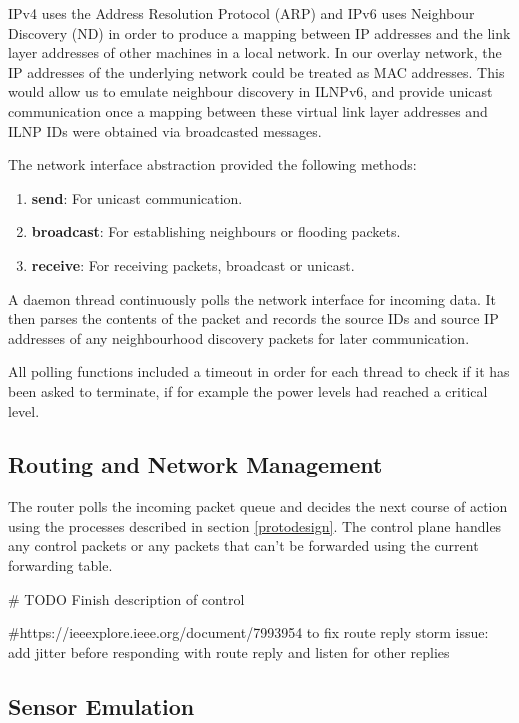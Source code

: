\documentclass[12pt]{article}
\begin{document}
IPv4 uses the Address Resolution Protocol (ARP) and IPv6 uses Neighbour Discovery (ND) in order to produce a mapping between IP addresses and the link layer addresses of other machines in a local network. In our overlay network, the IP addresses of the underlying network could be treated as MAC addresses. This would allow us to emulate neighbour discovery in ILNPv6, and provide unicast communication once a mapping between these virtual link layer addresses and ILNP IDs were obtained via broadcasted messages. 

The network interface abstraction provided the following methods:
\begin{enumerate}
	\item \textbf{send}: For unicast communication.
	\item \textbf{broadcast}: For establishing neighbours or flooding packets.
	\item \textbf{receive}: For receiving packets, broadcast or unicast.
\end{enumerate}

A daemon thread continuously polls the network interface for incoming data. It then parses the contents of the packet and records the source IDs and source IP addresses of any neighbourhood discovery packets for later communication. 

All polling functions included a timeout in order for each thread to check if it has been asked to terminate, if for example the power levels had reached a critical level.

\subsection{Routing and Network Management}

The router polls the incoming packet queue and decides the next course of action using the processes described in section \ref{protodesign}. The control plane handles any control packets or any packets that can't be forwarded using the current forwarding table.

\# TODO Finish description of control 

\#https://ieeexplore.ieee.org/document/7993954 to fix route reply storm issue: add jitter before responding with route reply and listen for other replies

\subsection{Sensor Emulation}
\end{document}
